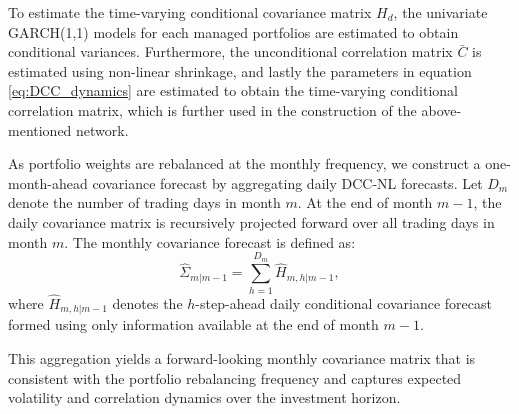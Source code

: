 \documentclass[11pt]{article}
\begin{document}
To estimate the time-varying conditional covariance matrix $H_d$, the univariate GARCH(1,1) models for each managed portfolios are estimated to obtain conditional variances. Furthermore, the unconditional correlation matrix $\bar{C}$ is estimated using non-linear shrinkage, and lastly the parameters in equation \ref{eq:DCC_dynamics} are estimated to obtain the time-varying conditional correlation matrix, which is further used in the construction of the above-mentioned network.

As portfolio weights are rebalanced at the monthly frequency, we construct a one-month-ahead covariance forecast by aggregating daily DCC-NL forecasts. Let $D_m$ denote the number of trading days in month $m$. At the end of month $m-1$, the daily covariance matrix is recursively projected forward over all trading days in month $m$. The monthly covariance forecast is defined as:
\begin{equation}
\widehat{\Sigma}_{m|m-1}
=
\sum_{h=1}^{D_m}
\widehat{H}_{m,h|m-1},
\end{equation}
where $\widehat{H}_{m,h|m-1}$ denotes the $h$-step-ahead daily conditional covariance forecast formed using only information available at the end of month $m-1$. 

This aggregation yields a forward-looking monthly covariance matrix that is consistent with the portfolio rebalancing frequency and captures expected volatility and correlation dynamics over the investment horizon.
\end{document}
